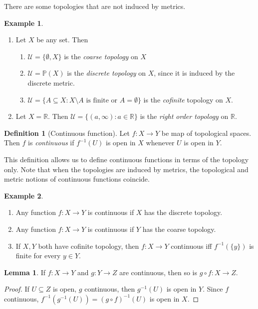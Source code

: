 \documentclass[a4paper,11pt]{article}
\theoremstyle{definition}
\newtheorem*{defn}{Definition}
\newtheorem*{ex}{Example}
\newtheorem*{lem}{Lemma}
\numberwithin{equation}{section}
\begin{document}
There are some topologies that are not induced by metrics.

\begin{ex}
\leavevmode
\begin{enumerate}
    \item Let $X$ be any set. Then
    \begin{enumerate}
        \item $\mathcal{U}=\{\emptyset,X\}$ is the \emph{coarse topology} on $X$
        \item $\mathcal{U}=\mathbb{P}(X)$ is the \emph{discrete topology} on $X$, since it is induced by the discrete metric.
        \item $\mathcal{U}=\{A\subseteq X: X\setminus A \text{ is finite or }A=\emptyset\}$ is the \emph{cofinite} topology on $X$.
    \end{enumerate}
    \item Let $X=\mathbb{R}$. Then $\mathcal{U} = \{(a,\infty):a\in\mathbb{R}\}$ is the \emph{right order topology} on $\mathbb{R}$.
\end{enumerate}
\end{ex}

\begin{defn}[Continuous function]
Let $f:X\rightarrow Y$ be map of topological spaces. Then $f$ is \emph{continuous} if $f^{-1}(U)$ is open in $X$ whenever $U$ is open in $Y$.

This definition allows us to define continuous functions in terms of the topology only. Note that when the topologies are induced by metrics, the topological and metric notions of continuous functions coincide.
\end{defn}

\begin{ex}
\leavevmode
\begin{enumerate}
    \item Any function $f:X\rightarrow Y$ is continuous if $X$ has the discrete topology.
    \item Any function $f:X\rightarrow Y$ is continuous if $Y$ has the coarse topology.
    \item If $X,Y$ both have cofinite topology, then $f:X\rightarrow Y$ continuous iff $f^{-1}(\{y\})$ is finite for every $y\in Y$.
\end{enumerate}
\end{ex}

\begin{lem}
If $f:X\rightarrow Y$ and $g:Y\rightarrow Z$ are continuous, then so is $g\circ f:X\rightarrow Z$.
\end{lem}
\begin{proof}
If $U\subseteq Z$ is open, $g$ continuous, then $g^{-1}(U)$ is open in $Y$. Since $f$ continuous, $f^{-1}(g^{-1}(U))=(g\circ f)^{-1}(U)$ is open in $X$.
\end{proof}
\end{document}
